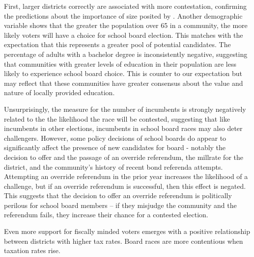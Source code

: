 First, larger districts correctly are associated with more contestation, 
confirming the predictions about the importance of size posited by \citet{oliver12}. 
Another demographic variable shows that the greater the population over 65 in a community,  
the more likely voters will have a choice for school board election. This matches 
with the expectation that this represents a greater pool of potential candidates. 
The percentage of adults with a bachelor degree is inconsistently negative, suggesting 
that communities with greater levels of education in their population are less 
likely to experience school board choice. This is counter to our expectation but 
may reflect that these communities have greater consensus about the value and nature 
of locally provided education. 

Unsurprisingly, the measure for the number of incumbents is strongly 
negatively related to the the likelihood the race will be contested, suggesting 
that like incumbents in other elections, incumbents in school board races may 
also deter challengers. However, some policy decisions of school boards do 
appear to significantly affect the presence of new candidates for board - notably 
the decision to offer and the passage of an override referendum, the millrate 
for the district, and the community's history of recent bond referenda attempts. 
Attempting an override referendum in the prior year increases the likelihood of a 
challenge, but if an override referendum is successful, then this effect is negated. 
This suggests that the decision to offer an override referendum is politically perilous 
for school board members -- if they misjudge the community and the referendum fails, 
they increase their chance for a contested election. 

Even more support for fiscally minded voters emerges with a positive relationship 
between districts with higher tax rates. Board races are more contentious when taxation 
rates rise. 







